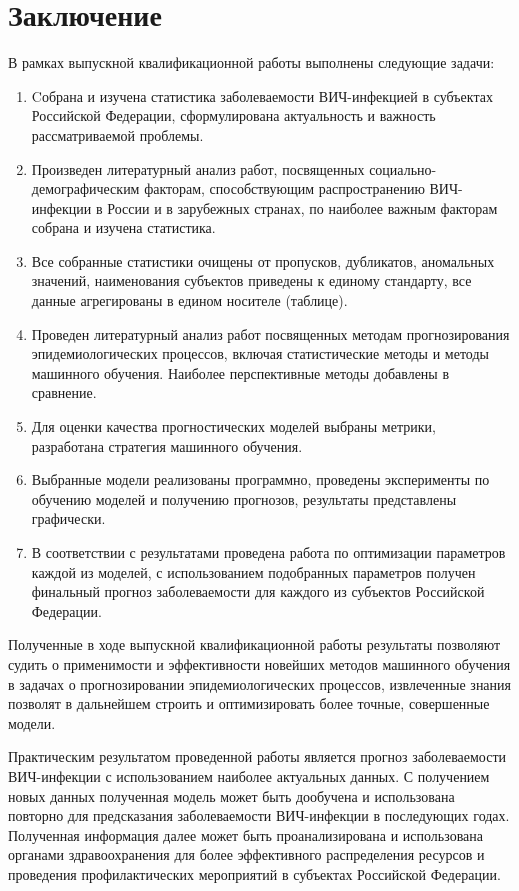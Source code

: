 \chapter*{Заключение}
\label{ch:conclusion}
\linespread{1.5}
В рамках выпускной квалификационной работы выполнены следующие задачи:

\begin{enumerate}
	\item Cобрана и изучена статистика заболеваемости ВИЧ-инфекцией в субъектах Российской Федерации, сформулирована актуальность и важность рассматриваемой проблемы.
	
	\item Произведен литературный анализ работ, посвященных социально-демографическим факторам, способствующим распространению ВИЧ-инфекции в России и в зарубежных странах, по наиболее важным факторам собрана и изучена статистика.  
	
	\item Все собранные статистики очищены от пропусков, дубликатов, аномальных значений, наименования субъектов приведены к единому стандарту, все данные агрегированы в едином носителе (таблице).
	
	\item Проведен литературный анализ работ посвященных методам прогнозирования эпидемиологических процессов, включая статистические методы и методы машинного обучения. Наиболее перспективные методы добавлены в сравнение.
	
	\item Для оценки качества прогностических моделей выбраны метрики, разработана стратегия машинного обучения.
	
	\item Выбранные модели реализованы программно, проведены эксперименты по обучению моделей и получению прогнозов, результаты представлены графически.
	
	\item В соответствии с результатами проведена работа по оптимизации параметров каждой из моделей, с использованием подобранных параметров получен финальный прогноз заболеваемости для каждого из субъектов Российской Федерации.
	
\end{enumerate}

Полученные в ходе выпускной квалификационной работы результаты позволяют судить о применимости и эффективности новейших методов машинного обучения в задачах о прогнозировании эпидемиологических процессов, извлеченные знания позволят в дальнейшем строить и оптимизировать более точные, совершенные модели.

Практическим результатом проведенной работы является прогноз заболеваемости ВИЧ-инфекции с использованием наиболее актуальных данных. С получением новых данных полученная модель может быть дообучена и использована повторно для предсказания заболеваемости ВИЧ-инфекции в последующих годах. Полученная информация далее может быть проанализирована и использована органами здравоохранения для более эффективного распределения ресурсов и проведения профилактических мероприятий в субъектах Российской Федерации. 


\endinput